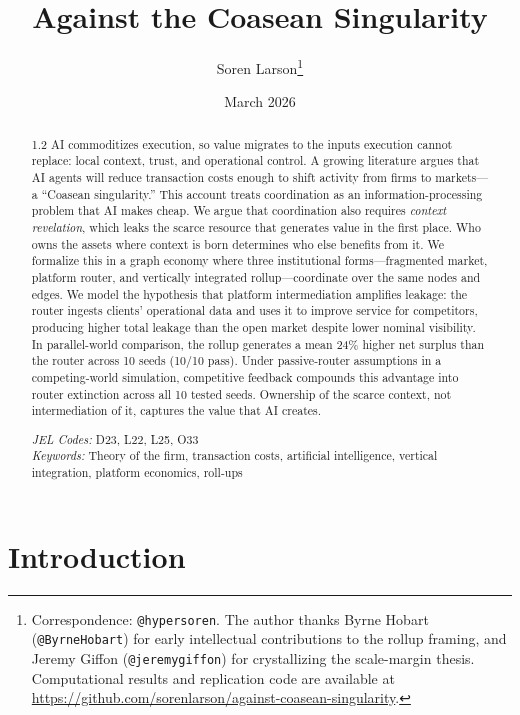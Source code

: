 \documentclass[12pt]{article}
\title{\textbf{Against the Coasean Singularity}}
\author{Soren Larson\thanks{Correspondence: \texttt{@hypersoren}. The author thanks Byrne Hobart (\texttt{@ByrneHobart}) for early intellectual contributions to the rollup framing, and Jeremy Giffon (\texttt{@jeremygiffon}) for crystallizing the scale-margin thesis. Computational results and replication code are available at \url{https://github.com/sorenlarson/against-coasean-singularity}.}}
\date{March 2026}
\theoremstyle{definition}
\begin{document}
\maketitle

\begin{abstract}
\begin{spacing}{1.2}
\noindent AI commoditizes execution, so value migrates to the inputs execution cannot replace: local context, trust, and operational control. A growing literature argues that AI agents will reduce transaction costs enough to shift activity from firms to markets---a ``Coasean singularity.'' This account treats coordination as an information-processing problem that AI makes cheap. We argue that coordination also requires \textit{context revelation}, which leaks the scarce resource that generates value in the first place. Who owns the assets where context is born determines who else benefits from it. We formalize this in a graph economy where three institutional forms---fragmented market, platform router, and vertically integrated rollup---coordinate over the same nodes and edges. We model the hypothesis that platform intermediation amplifies leakage: the router ingests clients' operational data and uses it to improve service for competitors, producing higher total leakage than the open market despite lower nominal visibility. In parallel-world comparison, the rollup generates a mean 24\% higher net surplus than the router across 10 seeds (10/10 pass). Under passive-router assumptions in a competing-world simulation, competitive feedback compounds this advantage into router extinction across all 10 tested seeds. Ownership of the scarce context, not intermediation of it, captures the value that AI creates.

\bigskip
\noindent \textit{JEL Codes:} D23, L22, L25, O33 \\
\textit{Keywords:} Theory of the firm, transaction costs, artificial intelligence, vertical integration, platform economics, roll-ups
\end{spacing}
\end{abstract}

\newpage
\tableofcontents
\newpage

\section{Introduction}
\end{document}
